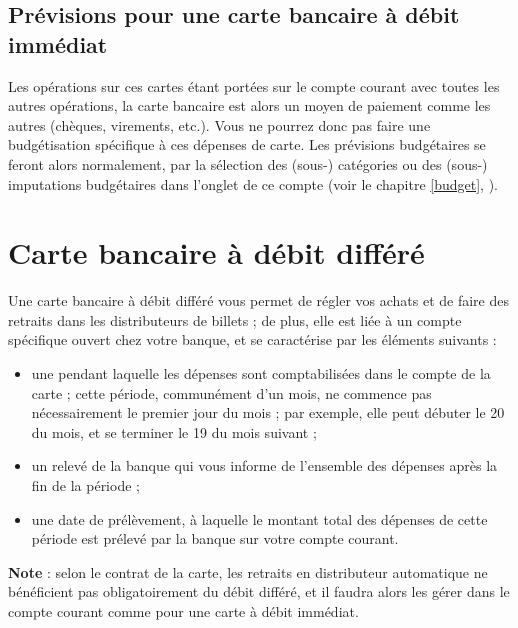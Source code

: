 \subsection{Prévisions pour une carte bancaire à débit immédiat\label{bankcard-quickCard-budget}}

Les opérations sur ces cartes étant portées sur le compte courant avec toutes les autres opérations, la carte bancaire est alors un moyen de paiement comme les autres (chèques, virements, etc.). Vous ne pourrez donc pas faire une budgétisation spécifique à ces dépenses de carte. Les prévisions budgétaires se feront alors normalement, par la sélection des (sous-) catégories ou des (sous-) imputations budgétaires dans l'onglet  de ce compte (voir le chapitre \vref{budget}, ). 


\section{Carte bancaire à débit différé\label{bankcard-deferredCard}}


Une carte bancaire à débit différé vous permet de régler vos achats et de faire des retraits dans les distributeurs de billets ; de plus, elle est liée à un compte spécifique ouvert chez votre banque, et se caractérise par les éléments suivants :

\begin{itemize}
	 \item une   pendant laquelle les dépenses sont comptabilisées dans le compte de la carte ; cette période, communément d'un mois, ne commence pas nécessairement le premier jour du mois ; par exemple, elle peut débuter le 20 du mois, et se terminer le 19 du mois suivant ;
	 \item un relevé de la banque qui vous informe de l'ensemble des dépenses après la fin de la période ;
 	 \item une date  de prélèvement, à laquelle le montant total des dépenses de cette période est prélevé par la banque sur votre compte courant.
\end{itemize}

\textbf{Note} : selon le contrat de la carte, les retraits en distributeur automatique ne bénéficient pas obligatoirement du débit différé, et il faudra alors les gérer dans le compte courant comme pour une carte à débit immédiat.


